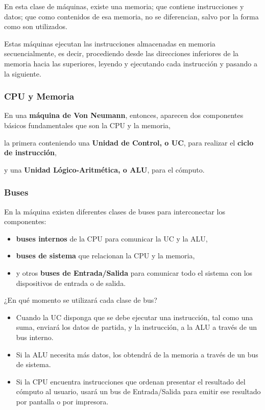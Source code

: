 \documentclass[spanish,a4paper,]{article}
\providecommand{\tightlist}{%
  \setlength{\itemsep}{0pt}\setlength{\parskip}{0pt}}
\begin{document}
En esta clase de máquinas, existe una memoria; que contiene
instrucciones y datos; que como contenidos de esa memoria, no se
diferencian, salvo por la forma como son utilizados.

Estas máquinas ejecutan las instrucciones almacenadas en memoria
secuencialmente, es decir, procediendo desde las direcciones inferiores
de la memoria hacia las superiores, leyendo y ejecutando cada
instrucción y pasando a la siguiente.

\hypertarget{cpu-y-memoria}{%
\subsubsection{CPU y Memoria}\label{cpu-y-memoria}}

En una \textbf{máquina de Von Neumann}, entonces, aparecen dos
componentes básicos fundamentales que son la CPU y la memoria,

la primera conteniendo una \textbf{Unidad de Control, o UC}, para
realizar el \textbf{ciclo de instrucción},

y una \textbf{Unidad Lógico-Aritmética, o ALU}, para el cómputo.

\hypertarget{buses}{%
\subsubsection{Buses}\label{buses}}

En la máquina existen diferentes clases de buses para interconectar los
componentes:

\begin{itemize}
\item
  \textbf{buses internos} de la CPU para comunicar la UC y la ALU,
\item
  \textbf{buses de sistema} que relacionan la CPU y la memoria,
\item
  y otros \textbf{buses de Entrada/Salida} para comunicar todo el
  sistema con los dispositivos de entrada o de salida.
\end{itemize}

¿En qué momento se utilizará cada clase de bus?

\begin{itemize}
\tightlist
\item
  Cuando la UC disponga que se debe ejecutar una instrucción, tal como
  una suma, enviará los datos de partida, y la instrucción, a la ALU a
  través de un bus interno.
\item
  Si la ALU necesita más datos, los obtendrá de la memoria a través de
  un bus de sistema.
\item
  Si la CPU encuentra instrucciones que ordenan presentar el resultado
  del cómputo al usuario, usará un bus de Entrada/Salida para emitir ese
  resultado por pantalla o por impresora.
\end{itemize}
\end{document}
